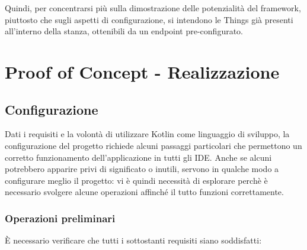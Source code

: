 \documentclass[12pt,a4paper,openright,oneside]{report}
\begin{document}
Quindi, per concentrarsi più sulla dimostrazione delle potenzialità del framework, piuttosto che sugli aspetti di configurazione, si intendono le Things già presenti all'interno della stanza, ottenibili da un endpoint pre-configurato.



\clearpage{\pagestyle{empty}\cleardoublepage}
\chapter{Proof of Concept - Realizzazione}           %
\lhead[\fancyplain{}{\bfseries\thepage}]{\fancyplain{}{\bfseries\rightmark}}  


\section{Configurazione}
Dati i requisiti e la volontà di utilizzare Kotlin come linguaggio di sviluppo, la configurazione del progetto richiede alcuni passaggi particolari che permettono un corretto funzionamento dell'applicazione in tutti gli IDE. Anche se alcuni potrebbero apparire privi di significato o inutili, servono in qualche modo a configurare meglio il progetto: vi è quindi necessità di esplorare perchè è necessario svolgere alcune operazioni affinché il tutto funzioni correttamente.

\subsection{Operazioni preliminari}
È necessario verificare che tutti i sottostanti requisiti siano soddisfatti:
\end{document}
